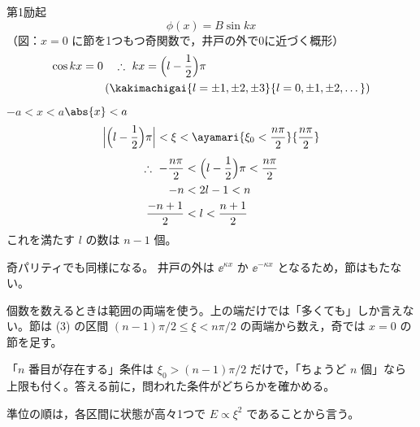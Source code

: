 第1励起
\[ \phi(x)=B\sin kx \]
（図：$x=0$ に節を1つもつ奇関数で，井戸の外で0に近づく概形）
\begin{align*}
\cos kx&=0\quad\therefore\ kx=\Bigl(l-\frac{1}{2}\Bigr)\pi\\
&\qquad(\kakimachigai{l=\pm1,\pm2,\pm3}{l=0,\pm1,\pm2,\dots})
\end{align*}
$-a<x<a$\qquad$\abs{x}<a$
\[ \Bigl|\Bigl(l-\frac{1}{2}\Bigr)\pi\Bigr|<\xi<\ayamari{\xi_{0}<\frac{n\pi}{2}}{\frac{n\pi}{2}} \]
\begin{align*}
\therefore\ -\frac{n\pi}{2}&<\Bigl(l-\frac{1}{2}\Bigr)\pi<\frac{n\pi}{2}\\
-n&<2l-1<n\\
\frac{-n+1}{2}&<l<\frac{n+1}{2}
\end{align*}
これを満たす $l$ の数は $n-1$ 個。

奇パリティでも同様になる。
井戸の外は $\ee^{\kappa x}$ か $\ee^{-\kappa x}$ となるため，節はもたない。
\item {} 個数を数えるときは範囲の両端を使う。上の端だけでは「多くても」しか言えない。節は (3) の区間 $(n-1)\pi/2\le\xi<n\pi/2$ の両端から数え，奇では $x=0$ の節を足す。
\item 「$n$ 番目が存在する」条件は $\xi_{0}>(n-1)\pi/2$ だけで，「ちょうど $n$ 個」なら上限も付く。答える前に，問われた条件がどちらかを確かめる。
\item 準位の順は，各区間に状態が高々1つで $E\propto\xi^{2}$ であることから言う。
